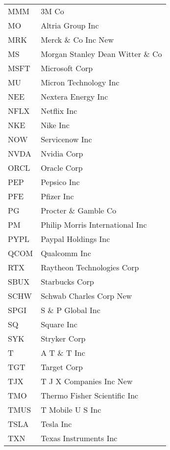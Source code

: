\begin{tabular}{ll}
MMM    &                             3M Co \\
MO     &                  Altria Group Inc \\
MRK    &               Merck \& Co Inc New \\
MS     &  Morgan Stanley Dean Witter \& Co \\
MSFT   &                    Microsoft Corp \\
MU     &             Micron Technology Inc \\
NEE    &                Nextera Energy Inc \\
NFLX   &                       Netflix Inc \\
NKE    &                          Nike Inc \\
NOW    &                    Servicenow Inc \\
NVDA   &                       Nvidia Corp \\
ORCL   &                       Oracle Corp \\
PEP    &                       Pepsico Inc \\
PFE    &                        Pfizer Inc \\
PG     &              Procter \& Gamble Co \\
PM     &   Philip Morris International Inc \\
PYPL   &               Paypal Holdings Inc \\
QCOM   &                      Qualcomm Inc \\
RTX    &        Raytheon Technologies Corp \\
SBUX   &                    Starbucks Corp \\
SCHW   &           Schwab Charles Corp New \\
SPGI   &                 S \& P Global Inc \\
SQ     &                        Square Inc \\
SYK    &                      Stryker Corp \\
T      &                      A T \& T Inc \\
TGT    &                       Target Corp \\
TJX    &           T J X Companies Inc New \\
TMO    &      Thermo Fisher Scientific Inc \\
TMUS   &                  T Mobile U S Inc \\
TSLA   &                         Tesla Inc \\
TXN    &             Texas Instruments Inc \\

\end{tabular}

